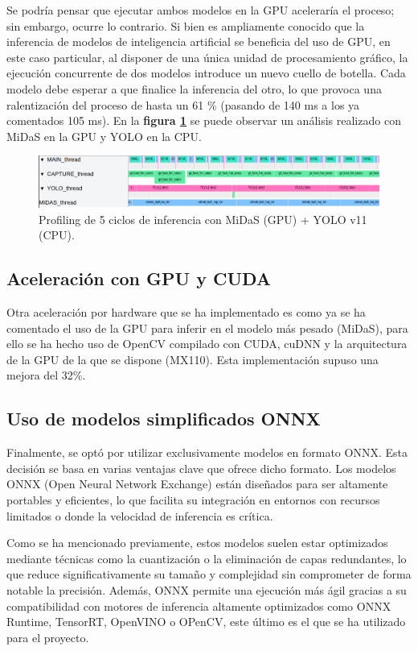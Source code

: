 Se podría pensar que ejecutar ambos modelos en la GPU aceleraría el proceso; sin embargo, ocurre lo contrario. Si bien es ampliamente conocido que la inferencia de modelos de inteligencia artificial se beneficia del uso de GPU, en este caso particular, al disponer de una única unidad de procesamiento gráfico, la ejecución concurrente de dos modelos introduce un nuevo cuello de botella. Cada modelo debe esperar a que finalice la inferencia del otro, lo que provoca una ralentización del proceso de hasta un 61 \% (pasando de 140 ms a los ya comentados 105 ms). En la \textbf{figura \ref{fig:midas_yolo_rpfiling}} se puede observar un análisis realizado con MiDaS en la GPU y YOLO en la CPU.


\begin{figure}[htbp]
    \centering
    \includegraphics[width=1\textwidth]{images/profiling_midas_yolo.png}
    \caption{Profiling de 5 ciclos de inferencia con MiDaS (GPU) + YOLO v11 (CPU).}
    \label{fig:midas_yolo_rpfiling}
\end{figure}


        \subsection{Aceleración con GPU y CUDA}
Otra aceleración por hardware que se ha implementado es como ya se ha comentado el uso de la GPU para inferir en el modelo más pesado (MiDaS), para ello se ha hecho uso de OpenCV compilado con CUDA, cuDNN y la arquitectura de la GPU de la que se dispone (MX110). Esta implementación supuso una mejora del 32\%.

        \subsection{Uso de modelos simplificados ONNX}
Finalmente, se optó por utilizar exclusivamente modelos en formato ONNX. Esta decisión se basa en varias ventajas clave que ofrece dicho formato. Los modelos ONNX (Open Neural Network Exchange) están diseñados para ser altamente portables y eficientes, lo que facilita su integración en entornos con recursos limitados o donde la velocidad de inferencia es crítica.

Como se ha mencionado previamente, estos modelos suelen estar optimizados mediante técnicas como la cuantización o la eliminación de capas redundantes, lo que reduce significativamente su tamaño y complejidad sin comprometer de forma notable la precisión. Además, ONNX permite una ejecución más ágil gracias a su compatibilidad con motores de inferencia altamente optimizados como ONNX Runtime, TensorRT, OpenVINO o OPenCV, este último es el que se ha utilizado para el proyecto.
